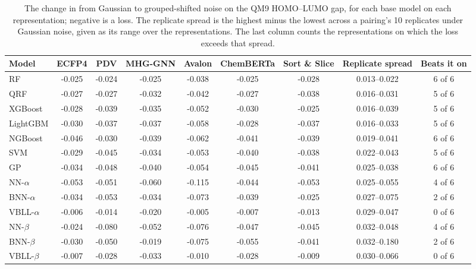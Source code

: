 \begin{table}[!htbp]
\centering
\small
\begin{adjustbox}{max width=\textwidth,max totalheight=0.78\textheight}
\begin{tabular}{lcccccccc}
\toprule
Model & ECFP4 & PDV & MHG-GNN & Avalon & ChemBERTa & Sort \& Slice & Replicate spread & Beats it on \\
\midrule
RF & -0.025 & -0.024 & -0.025 & -0.038 & -0.025 & -0.028 & 0.013--0.022 & 6 of 6 \\
QRF & -0.027 & -0.027 & -0.032 & -0.042 & -0.027 & -0.038 & 0.016--0.031 & 5 of 6 \\
XGBoost & -0.028 & -0.039 & -0.035 & -0.052 & -0.030 & -0.025 & 0.016--0.039 & 5 of 6 \\
LightGBM & -0.030 & -0.037 & -0.037 & -0.058 & -0.028 & -0.037 & 0.016--0.033 & 5 of 6 \\
NGBoost & -0.046 & -0.030 & -0.039 & -0.062 & -0.041 & -0.039 & 0.019--0.041 & 6 of 6 \\
SVM & -0.029 & -0.045 & -0.034 & -0.053 & -0.040 & -0.038 & 0.022--0.043 & 5 of 6 \\
GP & -0.034 & -0.048 & -0.040 & -0.054 & -0.045 & -0.041 & 0.025--0.038 & 6 of 6 \\
NN-$\alpha$ & -0.053 & -0.051 & -0.060 & -0.115 & -0.044 & -0.053 & 0.025--0.055 & 4 of 6 \\
BNN-$\alpha$ & -0.034 & -0.053 & -0.034 & -0.073 & -0.039 & -0.025 & 0.027--0.075 & 2 of 6 \\
VBLL-$\alpha$ & -0.006 & -0.014 & -0.020 & -0.005 & -0.007 & -0.013 & 0.029--0.047 & 0 of 6 \\
NN-$\beta$ & -0.024 & -0.080 & -0.052 & -0.076 & -0.047 & -0.045 & 0.032--0.048 & 4 of 6 \\
BNN-$\beta$ & -0.030 & -0.050 & -0.019 & -0.075 & -0.055 & -0.041 & 0.032--0.180 & 2 of 6 \\
VBLL-$\beta$ & -0.007 & -0.028 & -0.033 & -0.010 & -0.028 & -0.009 & 0.030--0.066 & 0 of 6 \\
\bottomrule
\end{tabular}
\end{adjustbox}
\caption[Change in robustness from Gaussian to grouped-shifted noise on QM9.]{The change in \aucnorm{} from Gaussian to grouped-shifted noise on the QM9 HOMO--LUMO gap, for each base model on each representation; negative is a loss. The replicate spread is the highest minus the lowest \aucnorm{} across a pairing's 10 replicates under Gaussian noise, given as its range over the representations. The last column counts the representations on which the loss exceeds that spread.}
\label{tab:condition_cost}
\end{table}

